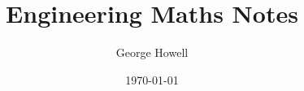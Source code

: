 \documentclass{article}
\title{Engineering Maths Notes}
\author{George Howell}
\date{\today}
\begin{document}
    \maketitle
    \newpage

    \tableofcontents
    \newpage

    
    \pagebreak
    
\end{document}
